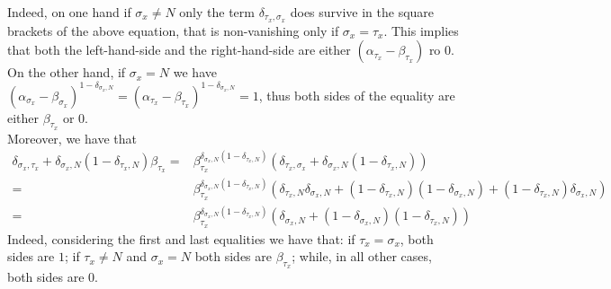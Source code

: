\documentclass[10pt]{article}
\numberwithin{equation}{section}
\numberwithin{equation}{subsection}
\begin{document}
Indeed, on one hand if $\sigma_{x}\neq N$ only the term $\delta_{\tau_{x},\sigma_{x}}$ does survive in the square brackets of the above equation, that is non-vanishing only if $\sigma_{x}=\tau_{x}$. This implies that both the left-hand-side and the right-hand-side are either $(\alpha_{\tau_{x}}-\beta_{\tau_{x}})$ ro $0$. On the other hand, if $\sigma_{x}=N$ we have $(\alpha_{\sigma_{x}}-\beta_{\sigma_{x}})^{1-\delta_{\sigma_{x},N}}=(\alpha_{\tau_{x}}-\beta_{\tau_{x}})^{1-\delta_{\sigma_{x},N}}=1$, thus both sides of the equality are either $\beta_{\tau_{x}}$ or $0$.  \\
Moreover, we have that 
\begin{align}
	\delta_{\sigma_{x},\tau_{x}}+\delta_{\sigma_{x},N}(1-\delta_{\tau_{x},N})\beta_{\tau_{x}}=&\beta_{\tau_{x}}^{\delta_{\sigma_{x},N}(1-\delta_{\tau_{x},N})}\left(\delta_{\tau_{x},\sigma_{x}}+\delta_{\sigma_{x},N}(1-\delta_{\tau_{x},N})\right)\nonumber\\
	=&\beta_{\tau_{x}}^{\delta_{\sigma_{x},N}(1-\delta_{\tau_{x},N})}\left(\delta_{\tau_{x},N}\delta_{\sigma_{x},N}+(1-\delta_{\tau_{x},N})(1-\delta_{\sigma_{x},N})+(1-\delta_{\tau_{x},N})\delta_{\sigma_{x},N}\right)\nonumber\\
	=&\beta_{\tau_{x}}^{\delta_{\sigma_{x},N}(1-\delta_{\tau_{x},N})}\left(\delta_{\sigma_{x},N}+(1-\delta_{\sigma_{x},N})(1-\delta_{\tau_{x},N})\right)
\end{align}
Indeed, considering the first and last equalities we have that: if $\tau_{x}=\sigma_{x}$, both sides are $1$; if $\tau_{x}\neq N$ and $\sigma_{x}=N$ both sides are $\beta_{\tau_{x}}$; while, in all other cases, both sides are $0$. 
\end{document}
